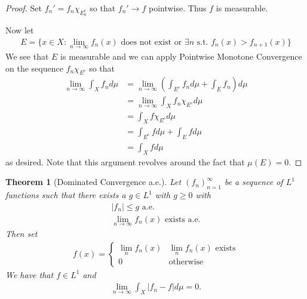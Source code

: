 \documentclass[11pt]{amsart}
\newtheorem{theorem}{Theorem}[section]
\theoremstyle{definition}
\numberwithin{equation}{section}
\begin{document}
\begin{proof}
    Set $f_n'=f_n\chi_{E_0^c}$ so that $f_n'\to f$ pointwise. Thus $f$ is measurable.

    Now let
    \begin{align*}
        E=\{x\in X:\lim_{n\to\infty}f_n(x)\text{ does not exist or }\exists n\text{ s.t. }f_n(x)>f_{n+1}(x)\}
    \end{align*}
    We see that $E$ is measurable and we can apply Pointwise Monotone Convergence on the sequence $f_n\chi_{E^c}$ so that
    \begin{align*}
        \lim_{n\to\infty}\int_Xf_nd\mu&=\lim_{n\to\infty}\left(\int_{E^c}f_nd\mu+\int_Ef_n\right)d\mu\\
        &=\lim_{n\to\infty}\int_Xf_n\chi_{E^c}d\mu\\
        &=\int_X f\chi_{E^c}d\mu\\
        &=\int_{E^c}fd\mu+\int_Efd\mu\\
        &=\int_Xfd\mu
    \end{align*}
    as desired. Note that this argument revolves around the fact that $\mu(E)=0$.
\end{proof}
\begin{theorem}[Dominated Convergence a.e.]
    Let $(f_n)_{n=1}^\infty$ be a sequence of $L^1$ functions such that there exists a $g\in L^1$ with $g\ge0$ with
    \begin{align*}
        |f_n|\le g\text{ a.e.}\\
        \lim_{n\to\infty}f_n(x)\text{ exists a.e.}
    \end{align*}
    Then set 
    \begin{align*}
        f(x)=\begin{cases}
            \lim_nf_n(x)&\lim_nf_n(x)\text{ exists}\\
            0 & \text{otherwise}
        \end{cases}
    \end{align*}
    We have that $f\in L^1$ and 
    \begin{align*}
        \lim_{n\to\infty}\int_X|f_n-f|d\mu=0.
    \end{align*}
\end{theorem}
\end{document}
